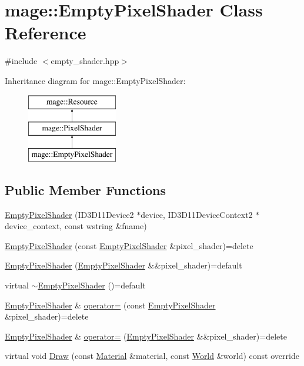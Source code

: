 \hypertarget{classmage_1_1_empty_pixel_shader}{}\section{mage\+:\+:Empty\+Pixel\+Shader Class Reference}
\label{classmage_1_1_empty_pixel_shader}


{\ttfamily \#include $<$empty\+\_\+shader.\+hpp$>$}

Inheritance diagram for mage\+:\+:Empty\+Pixel\+Shader\+:\begin{figure}[H]
\begin{center}
\leavevmode
\includegraphics[height=3.000000cm]{classmage_1_1_empty_pixel_shader}
\end{center}
\end{figure}
\subsection*{Public Member Functions}
\begin{DoxyCompactItemize}
\item 
\hyperlink{classmage_1_1_empty_pixel_shader_a7ef10491614de6eaa31d7845094d34a1}{Empty\+Pixel\+Shader} (I\+D3\+D11\+Device2 $\ast$device, I\+D3\+D11\+Device\+Context2 $\ast$device\+\_\+context, const wstring \&fname)
\item 
\hyperlink{classmage_1_1_empty_pixel_shader_a5eaa8370d531fcc7877cc706bc8fbcce}{Empty\+Pixel\+Shader} (const \hyperlink{classmage_1_1_empty_pixel_shader}{Empty\+Pixel\+Shader} \&pixel\+\_\+shader)=delete
\item 
\hyperlink{classmage_1_1_empty_pixel_shader_a151ae6546500995e33d34d0a2bfc5f49}{Empty\+Pixel\+Shader} (\hyperlink{classmage_1_1_empty_pixel_shader}{Empty\+Pixel\+Shader} \&\&pixel\+\_\+shader)=default
\item 
virtual \hyperlink{classmage_1_1_empty_pixel_shader_ace5053e12d6fa60caa2bcca00d192fab}{$\sim$\+Empty\+Pixel\+Shader} ()=default
\item 
\hyperlink{classmage_1_1_empty_pixel_shader}{Empty\+Pixel\+Shader} \& \hyperlink{classmage_1_1_empty_pixel_shader_a7702fdae1d752ed422d1508e6ee08479}{operator=} (const \hyperlink{classmage_1_1_empty_pixel_shader}{Empty\+Pixel\+Shader} \&pixel\+\_\+shader)=delete
\item 
\hyperlink{classmage_1_1_empty_pixel_shader}{Empty\+Pixel\+Shader} \& \hyperlink{classmage_1_1_empty_pixel_shader_a5eee18735b5bc109ca63a913fa8e374d}{operator=} (\hyperlink{classmage_1_1_empty_pixel_shader}{Empty\+Pixel\+Shader} \&\&pixel\+\_\+shader)=delete
\item 
virtual void \hyperlink{classmage_1_1_empty_pixel_shader_ababff79ea9746a94b838bb2f8dfd1fbf}{Draw} (const \hyperlink{structmage_1_1_material}{Material} \&material, const \hyperlink{classmage_1_1_world}{World} \&world) const override
\end{DoxyCompactItemize}
